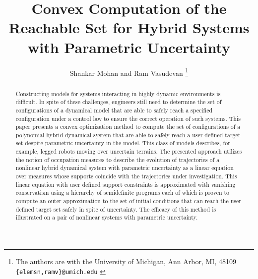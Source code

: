 \documentclass[letterpaper]{ieeeconf}
\begin{document}
	\title{Convex Computation of the Reachable Set for Hybrid Systems with Parametric Uncertainty}
	\author{Shankar Mohan and Ram Vasudevan
	\thanks{The authors are with the University of Michigan, Ann Arbor, MI, 48109 
	{\scriptsize \texttt{\{elemsn,ramv\}@umich.edu} } } }
  \maketitle
  \begin{abstract}
	Constructing models for systems interacting in highly dynamic environments is difficult.
	In spite of these challenges, engineers still need to determine the set of configurations of a dynamical model that are able to safely reach a specified configuration under a control law to ensure the correct operation of such systems. 
	This paper presents a convex optimization method to compute the set of configurations of a polynomial hybrid dynamical system that are able to safely reach a user defined target set despite parametric uncertainty in the model.
	This class of models describes, for example, legged robots moving over uncertain terrains. 
	The presented approach utilizes the notion of occupation measures to describe the evolution of trajectories of a nonlinear hybrid dynamical system with parametric uncertainty as a linear equation over measures whose supports coincide with the trajectories under investigation. 
	This linear equation with user defined support constraints is approximated with vanishing conservatism using a hierarchy of semidefinite programs each of which is proven to compute an outer approximation to the set of initial conditions that can reach the user defined target set safely in spite of uncertainty. 
	The efficacy of this method is illustrated on a pair of nonlinear systems with parametric uncertainty.
  \end{abstract}
  
  
  
  
  
  



\end{document}
